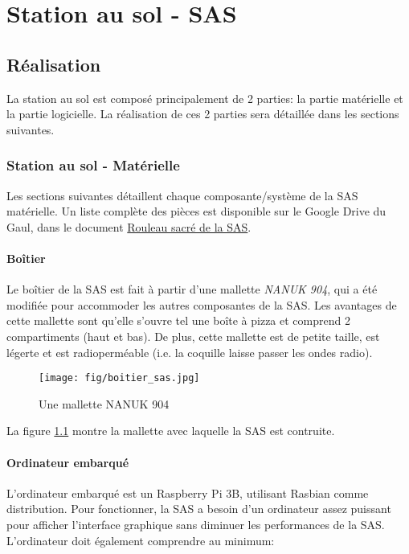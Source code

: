 \chapter{Station au sol - SAS}
\label{chap:sas}

\section{Réalisation}

La station au sol est composé principalement de 2 parties: la partie matérielle
et la partie logicielle. La réalisation de ces 2 parties sera détaillée dans
les sections suivantes.

\subsection{Station au sol - Matérielle}

Les sections suivantes détaillent chaque composante/système de la SAS
matérielle. Un liste complète des pièces est disponible sur le Google Drive du
Gaul, dans le document \href{https://drive.google.com/open?id=1WfV-Swc37Ih476rmRLYdwrBWRaUo8ZzXshS-LzYTQF4}{Rouleau sacré de la SAS}.

\subsubsection{Boîtier}

Le boîtier de la SAS est fait à partir d'une mallette \textit{NANUK 904}, qui a
été modifiée pour accommoder les autres composantes de la SAS. Les avantages de
cette mallette sont qu'elle s'ouvre tel une boîte à pizza et comprend 2
compartiments (haut et bas). De plus, cette mallette est de petite taille, est
légerte et est radioperméable (i.e. la coquille laisse passer les ondes radio).

\begin{figure}[H]
	\center
	\texttt{[image: fig/boitier\_sas.jpg]}
	\caption{Une mallette NANUK 904}
	\label{f:boitier_sas}
\end{figure}

La figure \ref{f:boitier_sas} montre la mallette avec laquelle la SAS est
contruite.

\subsubsection{Ordinateur embarqué}

L'ordinateur embarqué est un Raspberry Pi 3B, utilisant Rasbian comme
distribution. Pour fonctionner, la SAS a besoin d'un ordinateur assez puissant
pour afficher l'interface graphique sans diminuer les performances de la SAS.
L'ordinateur doit également comprendre au minimum:


